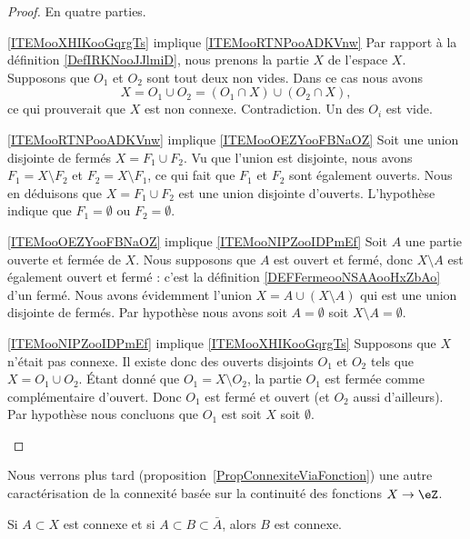 \begin{proof}
    En quatre parties.
    \begin{subproof}
    \item[\ref{ITEMooXHIKooGqrgTs} implique \ref{ITEMooRTNPooADKVnw}]
    Par rapport à la définition \ref{DefIRKNooJJlmiD}, nous prenons la partie \( X\) de l'espace \( X\). Supposons que \( O_1\) et \( O_2\) sont tout deux non vides. Dans ce cas nous avons
    \begin{equation}
        X= O_1\cup O_2 = (O_1\cap X)\cup (O_2\cap X),
    \end{equation}
    ce qui prouverait que \( X\) est non connexe. Contradiction. Un des \( O_i\) est vide.
    \item[\ref{ITEMooRTNPooADKVnw} implique \ref{ITEMooOEZYooFBNaOZ}]
        Soit une union disjointe de fermés \( X=F_1\cup F_2\). Vu que l'union est disjointe, nous avons \( F_1=X\setminus F_2\) et \( F_2=X\setminus F_1\), ce qui fait que \( F_1\) et \( F_2\) sont également ouverts. Nous en déduisons que \( X=F_1\cup F_2\) est une union disjointe d'ouverts. L'hypothèse indique que \( F_1=\emptyset\) ou \( F_2=\emptyset\).
    \item[\ref{ITEMooOEZYooFBNaOZ} implique \ref{ITEMooNIPZooIDPmEf}]
        Soit \( A\) une partie ouverte et fermée de \( X\). Nous supposons que \( A\) est ouvert et fermé, donc \( X\setminus A\) est également ouvert et fermé : c'est la définition \ref{DEFFermeooNSAAooHxZbAo} d'un fermé. Nous avons évidemment l'union $X=A\cup(X\setminus A)$ qui est une union disjointe de fermés. Par hypothèse nous avons soit \( A=\emptyset\) soit \( X\setminus A=\emptyset\).
    \item[\ref{ITEMooNIPZooIDPmEf} implique \ref{ITEMooXHIKooGqrgTs}]
        Supposons que \( X\) n'était pas connexe. Il existe donc des ouverts disjoints \( O_1\) et \( O_2\) tels que \( X=O_1\cup O_2\). Étant donné que \( O_1=X\setminus O_2\), la partie \( O_1\) est fermée comme complémentaire d'ouvert. Donc \( O_1\) est fermé et ouvert (et \( O_2\) aussi d'ailleurs). Par hypothèse nous concluons que \( O_1\) est soit \( X\) soit \( \emptyset\).
    \end{subproof}
\end{proof}

Nous verrons plus tard (proposition~\ref{PropConnexiteViaFonction}) une autre caractérisation de la connexité basée sur la continuité des fonctions \( X\to \eZ\).

\begin{proposition}     \label{PROPooSCKNooRbewdv}
    Si \( A\subset X\) est connexe et si \( A\subset B\subset \bar A\), alors \( B\) est connexe.
\end{proposition}


